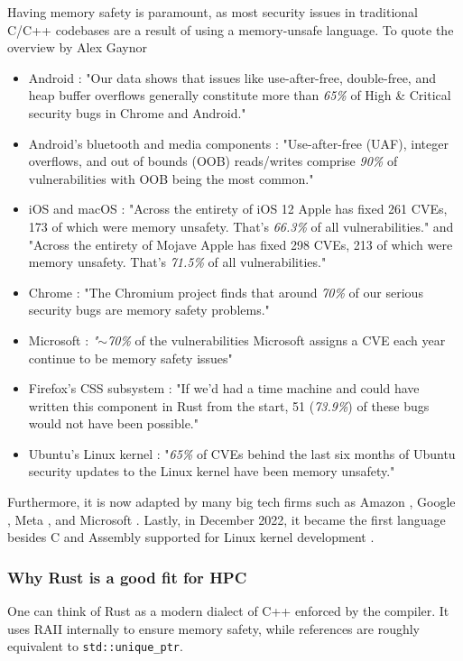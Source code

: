 Having memory safety is paramount, as most security issues in traditional C/C++ codebases are a result of using a memory-unsafe language. To quote the overview by Alex Gaynor \cite{gaynor}


\begin{itemize}
  \item Android \cite{androidmem}: "Our data shows that issues like use-after-free, double-free, and heap buffer overflows generally constitute more than \textit{65\%} of High \& Critical security bugs in Chrome and Android."
  \item Android’s bluetooth and media components \cite{androidmem2}: "Use-after-free (UAF), integer overflows, and out of bounds (OOB) reads/writes comprise \textit{90\%} of vulnerabilities with OOB being the most common."
  \item iOS and macOS \cite{iosmem}: "Across the entirety of iOS 12 Apple has fixed 261 CVEs, 173 of which were memory unsafety. That’s \textit{66.3\%} of all vulnerabilities." and "Across the entirety of Mojave Apple has fixed 298 CVEs, 213 of which were memory unsafety. That’s \textit{71.5\%} of all vulnerabilities."
  \item Chrome \cite{chromemem}: "The Chromium project finds that around \textit{70\%} of our serious security bugs are memory safety problems."
  \item Microsoft \cite{microsoftmem}: \textit{"$\sim$70\%} of the vulnerabilities Microsoft assigns a CVE each year continue to be memory safety issues"
  \item Firefox’s CSS subsystem \cite{ffmem}: "If we’d had a time machine and could have written this component in Rust from the start, 51 (\textit{73.9\%}) of these bugs would not have been possible."
  \item Ubuntu’s Linux kernel \cite{ubumem}: "\textit{65\%} of CVEs behind the last six months of Ubuntu security updates to the Linux kernel have been memory unsafety."
\end{itemize}

Furthermore, it is now adapted by many big tech firms such as Amazon \cite{awsrust}, Google \cite{googlerust}, Meta \cite{metarust}, and Microsoft \cite{msftrust}. Lastly, in December 2022, it became the first language besides C and Assembly supported for Linux kernel development \cite{linuxrust}.

\subsubsection{Why Rust is a good fit for HPC}
One can think of Rust as a modern dialect of C++ enforced by the compiler. It uses \ac{RAII} internally to ensure memory safety, while references are roughly equivalent to \texttt{std::unique\_ptr}.\\

